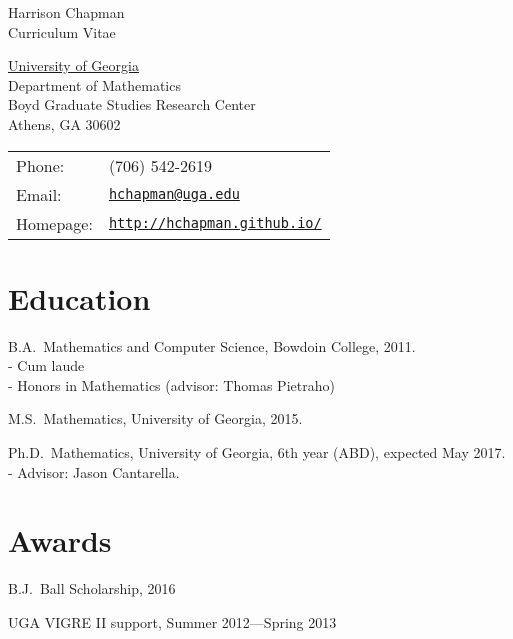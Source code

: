 \documentclass[letterpaper]{article}
\def\name{Harrison Chapman}
\renewenvironment{itemize}{
  \begin{list}{}{
    \setlength{\leftmargin}{1.5em}
  }
}{
  \end{list}
}
\begin{document}
{\huge \name}\\
{\large\sc Curriculum Vitae}


\vspace{0.25in}

\begin{minipage}{0.45\linewidth}
  \href{http://www.uga.edu/}{University of Georgia} \\
  Department of Mathematics \\
  Boyd Graduate Studies Research Center \\
  Athens, GA 30602
\end{minipage}
\begin{minipage}{0.45\linewidth}
  \begin{tabular}{ll}
    Phone: & (706) 542-2619 \\
    Email: & \href{mailto:hchapman@uga.edu}{\tt hchapman@uga.edu} \\
    Homepage: & \href{http://hchapman.github.io/}{\tt http://hchapman.github.io/} \\
  \end{tabular}
\end{minipage}

\section*{Education}

\begin{itemize}
  \item B.A.\ Mathematics and Computer Science, Bowdoin College,
    2011.\\
    - \quad Cum laude \\
    - \quad Honors in Mathematics (advisor: Thomas Pietraho)
  \item M.S.\ Mathematics, University of Georgia, 2015.
  \item Ph.D.\ Mathematics, University of Georgia, 6th year (ABD), expected May
    2017.\\
   - \quad Advisor: Jason Cantarella.
 \end{itemize}

 \section*{Awards}

 \begin{itemize}
 \item B.J.\ Ball Scholarship, 2016
 \item UGA VIGRE II support, Summer 2012---Spring 2013
 \end{itemize}
\end{document}
